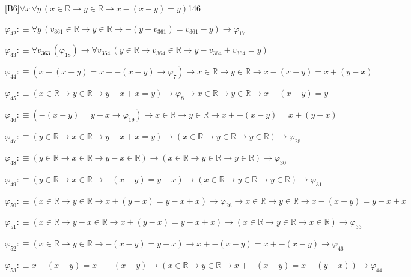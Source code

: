 \begin{fullproof}{[B6]}{$\forall x\,\forall y\,(x \in \mathbb{R} \to y \in \mathbb{R} \to x - (x - y) = y)$}{146}
\begin{abbrevlist}
\item $\varphi_{42} :\equiv \forall y\,(v_{361} \in \mathbb{R} \to y \in \mathbb{R} \to -(y - v_{361}) = v_{361} - y) \to \varphi_{17}$
\item $\varphi_{43} :\equiv \forall v_{363}\,(\varphi_{18}) \to \forall v_{364}\,(y \in \mathbb{R} \to v_{364} \in \mathbb{R} \to y - v_{364} + v_{364} = y)$
\item $\varphi_{44} :\equiv (x - (x - y) = x + -(x - y) \to \varphi_{7}) \to x \in \mathbb{R} \to y \in \mathbb{R} \to x - (x - y) = x + (y - x)$
\item $\varphi_{45} :\equiv (x \in \mathbb{R} \to y \in \mathbb{R} \to y - x + x = y) \to \varphi_{8} \to x \in \mathbb{R} \to y \in \mathbb{R} \to x - (x - y) = y$
\item $\varphi_{46} :\equiv (-(x - y) = y - x \to \varphi_{19}) \to x \in \mathbb{R} \to y \in \mathbb{R} \to x + -(x - y) = x + (y - x)$
\item $\varphi_{47} :\equiv (y \in \mathbb{R} \to x \in \mathbb{R} \to y - x + x = y) \to (x \in \mathbb{R} \to y \in \mathbb{R} \to y \in \mathbb{R}) \to \varphi_{28}$
\item $\varphi_{48} :\equiv (y \in \mathbb{R} \to x \in \mathbb{R} \to y - x \in \mathbb{R}) \to (x \in \mathbb{R} \to y \in \mathbb{R} \to y \in \mathbb{R}) \to \varphi_{30}$
\item $\varphi_{49} :\equiv (y \in \mathbb{R} \to x \in \mathbb{R} \to -(x - y) = y - x) \to (x \in \mathbb{R} \to y \in \mathbb{R} \to y \in \mathbb{R}) \to \varphi_{31}$
\item $\varphi_{50} :\equiv (x \in \mathbb{R} \to y \in \mathbb{R} \to x + (y - x) = y - x + x) \to \varphi_{26} \to x \in \mathbb{R} \to y \in \mathbb{R} \to x - (x - y) = y - x + x$
\item $\varphi_{51} :\equiv (x \in \mathbb{R} \to y - x \in \mathbb{R} \to x + (y - x) = y - x + x) \to (x \in \mathbb{R} \to y \in \mathbb{R} \to x \in \mathbb{R}) \to \varphi_{33}$
\item $\varphi_{52} :\equiv (x \in \mathbb{R} \to y \in \mathbb{R} \to -(x - y) = y - x) \to x + -(x - y) = x + -(x - y) \to \varphi_{46}$
\item $\varphi_{53} :\equiv x - (x - y) = x + -(x - y) \to (x \in \mathbb{R} \to y \in \mathbb{R} \to x + -(x - y) = x + (y - x)) \to \varphi_{44}$
\end{abbrevlist}
\end{fullproof}
